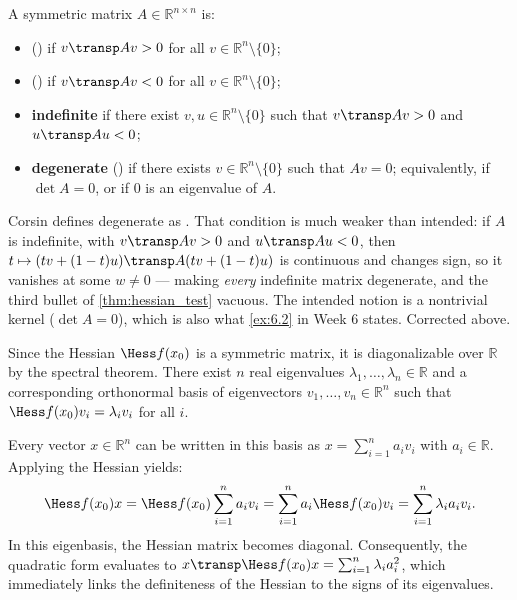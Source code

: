 \begin{definition}
\label{def:sign_symmetric_matrix}
A symmetric matrix $A \in \mathbb{R}^{n\times n}$ is:
\begin{itemize}
  \item {} () if $v\transp Av > 0$ for all
    $v \in \mathbb{R}^n\setminus\{0\}$;
  \item {} () if $v\transp Av < 0$ for all
    $v \in \mathbb{R}^n\setminus\{0\}$;
  \item \textbf{indefinite} if there exist $v, u \in \mathbb{R}^n\setminus\{0\}$ such that
    $v\transp Av > 0$ and $u\transp Au < 0$;
  \item \textbf{degenerate} () if there exists
    $v \in \mathbb{R}^n\setminus\{0\}$ such that $Av = 0$; equivalently, if $\det A = 0$, or
    if $0$ is an eigenvalue of $A$.
\end{itemize}
\end{definition}

\begin{ainote}
Corsin defines degenerate as . That
condition is much weaker than intended: if $A$ is indefinite, with $v\transp Av > 0$ and
$u\transp Au < 0$, then $t \mapsto (tv+(1-t)u)\transp A(tv+(1-t)u)$ is continuous and changes
sign, so it vanishes at some $w \neq 0$ --- making \emph{every} indefinite matrix degenerate,
and the third bullet of \cref{thm:hessian_test} vacuous. The intended notion is a nontrivial
kernel ($\det A = 0$), which is also what \cref{ex:6.2} in Week 6 states. Corrected above.

\end{ainote}

\begin{remark}
\label{rem:diagonalizing_hessian}
Since the Hessian $\Hess f(x_0)$ is a symmetric matrix, it is diagonalizable over $\mathbb{R}$ by the spectral theorem. There exist $n$ real eigenvalues $\lambda_1, \dots, \lambda_n \in \mathbb{R}$ and a corresponding orthonormal basis of eigenvectors $v_1, \dots, v_n \in \mathbb{R}^n$ such that $\Hess f(x_0) v_i = \lambda_i v_i$ for all $i$.

Every vector $x \in \mathbb{R}^n$ can be written in this basis as $x = \sum_{i=1}^n a_i v_i$ with $a_i \in \mathbb{R}$. Applying the Hessian yields:
\[
  \Hess f(x_0) x = \Hess f(x_0) \sum_{i=1}^n a_i v_i = \sum_{i=1}^n a_i \Hess f(x_0) v_i = \sum_{i=1}^n \lambda_i a_i v_i.
\]
In this eigenbasis, the Hessian matrix becomes diagonal. Consequently, the quadratic form evaluates to $x\transp \Hess f(x_0) x = \sum_{i=1}^n \lambda_i a_i^2$, which immediately links the definiteness of the Hessian to the signs of its eigenvalues.
\end{remark}


